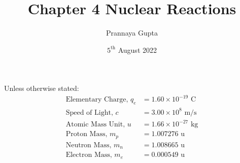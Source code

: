 \documentclass[a4paper, 12pt, addpoints]{exam}
\title{Chapter 4 \textbf{Nuclear Reactions}}
\author{Prannaya Gupta}
\date{$5^{\text{th}}$ August 2022}
\begin{document}
\maketitle


\begin{tcolorbox}
Unless otherwise stated:
\begin{align*}
\text{Elementary Charge, }q_e &= 1.60 \times 10^{-19}\text{ C} \\
\text{Speed of Light, }c &= 3.00 \times 10^8\text{ m/s} \\
\text{Atomic Mass Unit, }u &= 1.66 \times 10^{-27}\text{ kg} \\
\text{Proton Mass, }m_p &= 1.007276\text{ u} \\
\text{Neutron Mass, }m_n &= 1.008665\text{ u} \\
\text{Electron Mass, }m_e &= 0.000549\text{ u}
\end{align*}
\end{tcolorbox}
\end{document}
